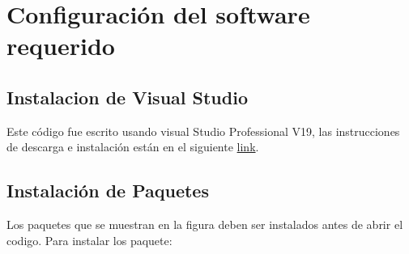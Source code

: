 \documentclass[letterpaper,12pt]{article}
\begin{document}
	
	
	\section{Configuración del software requerido}
	\subsection{Instalacion de Visual Studio}
	Este código fue escrito usando visual Studio Professional V19, las instrucciones de descarga e instalación están en el siguiente \href{https://visualstudio.microsoft.com/es/thank-you-downloading-visual-studio/?sku=Professional&rel=16}{link}.
	\subsection{Instalación de Paquetes}
	 Los paquetes que se muestran en la figura deben ser instalados antes de abrir el codigo.
	Para instalar los paquete:
\end{document}
